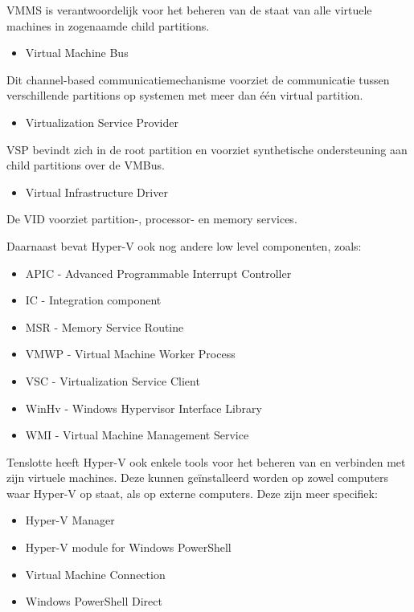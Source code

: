 VMMS is verantwoordelijk voor het beheren van de staat van alle virtuele machines in zogenaamde child partitions.

\begin{itemize}[noitemsep]
	\item Virtual Machine Bus
\end{itemize}

Dit channel-based communicatiemechanisme voorziet de communicatie tussen verschillende partitions op systemen met meer dan één virtual partition.

\begin{itemize}[noitemsep]
	\item Virtualization Service Provider
\end{itemize}

VSP bevindt zich in de root partition en voorziet synthetische ondersteuning aan child partitions over de VMBus.

\begin{itemize}[noitemsep]
	\item Virtual Infrastructure Driver
\end{itemize}

De VID voorziet partition-, processor- en memory services.

Daarnaast bevat Hyper-V ook nog andere low level componenten, zoals:

\begin{itemize}[noitemsep]
	\item APIC - Advanced Programmable Interrupt Controller
	\item IC - Integration component
	\item MSR - Memory Service Routine
	\item VMWP - Virtual Machine Worker Process 
	\item VSC - Virtualization Service Client
	\item WinHv  - Windows Hypervisor Interface Library 
	\item WMI - Virtual Machine Management Service 
\end{itemize}

Tenslotte heeft Hyper-V ook enkele tools voor het beheren van en verbinden met zijn virtuele machines. Deze kunnen geïnstalleerd worden op zowel computers waar Hyper-V op staat, als op externe computers. Deze zijn meer specifiek:

\begin{itemize}[noitemsep]
	\item Hyper-V Manager
	\item Hyper-V module for Windows PowerShell
	\item Virtual Machine Connection
	\item Windows PowerShell Direct
\end{itemize}

